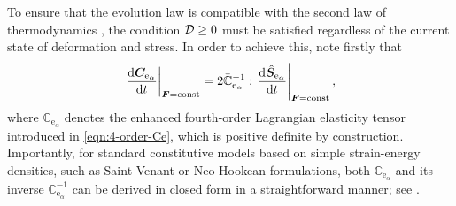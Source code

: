 To ensure that the evolution law is compatible with the second law of thermodynamics \cite{Gurtin2010}, the condition $\mathcal{D} \geq 0$ must be satisfied regardless of the current state of deformation and stress. In order to achieve this, note firstly that
%
\begin{equation}
	\label{eq23}
	\left.\frac{\mathrm{d}\boldsymbol{C}_{\mathrm{e}_{\alpha}} }{\mathrm{d}t} \right|_{\boldsymbol{F}=\text{const}} =
    2 \bar{\mathbb{C}}_{\mathrm{e}_{\alpha}}^{-1} : \left.\frac{\mathrm{d}\hat{\boldsymbol{S}}_{\mathrm{e}_{\alpha}} }{\mathrm{d}t} \right|_{\boldsymbol{F}=\text{const}},
\end{equation}
%
where $\bar{\mathbb{C}}_{\mathrm{e}_{\alpha}}$ denotes the enhanced fourth-order Lagrangian elasticity tensor introduced in \eqref{eqn:4-order-Ce}, which is positive definite by construction. Importantly, for standard constitutive models based on simple strain-energy densities, such as Saint-Venant or Neo-Hookean formulations, both $\mathbb{C}_{\mathrm{e}_{\alpha}}$ and its inverse $\mathbb{C}_{\mathrm{e}_{\alpha}}^{-1}$ can be derived in closed form in a straightforward manner; see \cite{Bonet_book_statics}.%
